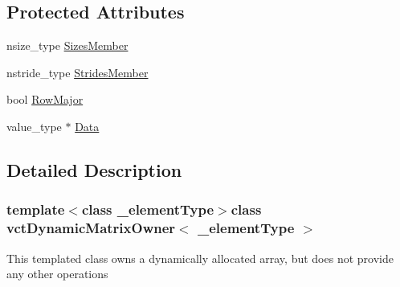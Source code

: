 \subsection*{Protected Attributes}
\begin{DoxyCompactItemize}
\item 
nsize\-\_\-type \hyperlink{classvct_dynamic_matrix_owner_a097dc19836d0b333289b633b9825d079}{Sizes\-Member}
\item 
nstride\-\_\-type \hyperlink{classvct_dynamic_matrix_owner_ab172c2ecf28deae244fb5f776dad0bef}{Strides\-Member}
\item 
bool \hyperlink{classvct_dynamic_matrix_owner_a5f3826269134e26c85b4ef66a2667c18}{Row\-Major}
\item 
value\-\_\-type $\ast$ \hyperlink{classvct_dynamic_matrix_owner_a5bbb48bdf7525decefe9b415c0ddc3b9}{Data}
\end{DoxyCompactItemize}


\subsection{Detailed Description}
\subsubsection*{template$<$class \-\_\-element\-Type$>$class vct\-Dynamic\-Matrix\-Owner$<$ \-\_\-element\-Type $>$}

This templated class owns a dynamically allocated array, but does not provide any other operations 


